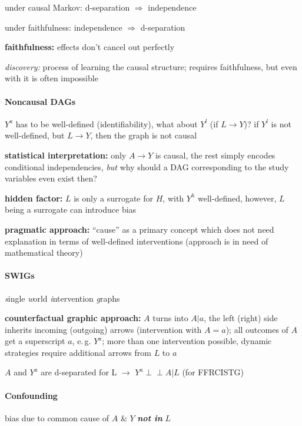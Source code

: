 \documentclass[8pt,twoside]{extarticle}
\newcommand{\indep}{\perp \!\!\! \perp}
\begin{document}
\begin{multicols}{2}
 under causal Markov: d-separation $\Rightarrow$ independence

 under faithfulness: independence $\Rightarrow$ d-separation

 \textbf{faithfulness:} effects don't cancel out perfectly

 \textit{discovery:} process of learning the causal structure; requires faithfulness, but even with it is often impossible


\paragraph{Noncausal DAGs} \citep{hernan2023causal}
$Y^a$ has to be well-defined (identifiability), what about $Y^l$ (if $L\to Y$)? \newline
if $Y^l$ is not well-defined, but $L \to Y$, then the graph is not causal

 \textbf{statistical interpretation:} only $A\to Y$ is causal, the rest simply encodes conditional independencies, \textit{but} why should a DAG corresponding to the study variables even exist then?

 \textbf{hidden factor:} $L$ is only a surrogate for $H$, with $Y^h$ well-defined, however, $L$ being a surrogate can introduce bias

 \textbf{pragmatic approach:} ``cause'' as a primary concept which does not need explanation in terms of well-defined interventions (approach is in need of mathematical theory)



\paragraph{SWIGs} \textit{s}ingle \textit{w}orld \textit{i}ntervention \textit{g}raphs

 \textbf{counterfactual graphic approach:}
$A$ turns into $A|a$, the left (right) side inherits incoming (outgoing) arrows (intervention with $A=a$); all outcomes of $A$ get a superscript $a$, e.\,g. $Y^a$; more than one intervention possible, dynamic strategies require additional arrows from $L$ to $a$


 $A$ and $Y^a$ are d-separated  for L $\rightarrow$ $Y^a \indep A|L$ (for FFRCISTG)



\paragraph{Confounding} bias due to common cause of $A$ \& $Y$ \textbf{\textit{not in}} $L$


\end{multicols}
\end{document}
